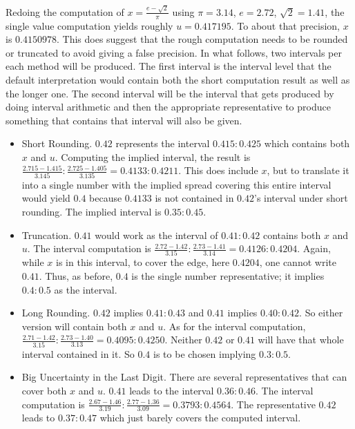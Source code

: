 \documentclass[12pt]{article}
\theoremstyle{remark}
\begin{document}
Redoing the computation of $x = \frac{e-\sqrt{2}}{\pi}$  using $\pi = 3.14$, $e=2.72$, $\sqrt{2} = 1.41$, the single value computation yields roughly $u = 0.417195$. To about that precision, $x$ is $0.4150978$. This does suggest that the rough computation needs to be rounded or truncated to avoid giving a false precision. In what follows, two intervals per each method will be produced. The first interval is the interval level that the default interpretation would contain both the short computation result as well as the longer one. The second interval will be the interval that gets produced by doing interval arithmetic and then the appropriate representative to produce something that contains that interval will also be given. 

\begin{itemize}
    \item Short Rounding. $0.42$ represents the interval $0.415:0.425$ which contains both $x$ and $u$.  Computing the implied interval, the result is $\frac{2.715-1.415}{3.145}: \frac{2.725-1.405}{3.135} = 0.4133:0.4211$. This does include $x$, but to translate it into a single number with the implied spread covering this entire interval would yield $0.4$ because $0.4133$ is not contained in $0.42$'s interval under short rounding. The implied interval is $0.35:0.45$.
    \item Truncation. $0.41$ would work as the interval of $0.41:0.42$ contains both $x$ and $u$. The interval computation is $\frac{2.72 - 1.42}{3.15}:\frac{2.73 - 1.41}{3.14} = 0.4126: 0.4204$. Again, while $x$ is in this interval, to cover the edge, here $0.4204$, one cannot write $0.41$. Thus, as before, $0.4$ is the single number representative; it implies $0.4:0.5$ as the interval. 
    \item Long Rounding. $0.42$ implies $0.41:0.43$ and $0.41$ implies $0.40:0.42$. So either version will contain both $x$ and $u$. As for the interval computation, $\frac{2.71 - 1.42}{3.15}:\frac{2.73 - 1.40}{3.13} = 0.4095: 0.4250$. Neither $0.42$ or $0.41$ will have that whole interval contained in it. So $0.4$ is to be chosen implying $0.3:0.5$. 
    \item Big Uncertainty in the Last Digit. There are several representatives that can cover both $x$ and $u$. $0.41$ leads to the interval $0.36:0.46$. The interval computation is $\frac{2.67 - 1.46}{3.19}:\frac{2.77 - 1.36}{3.09} = 0.3793: 0.4564$. The representative $0.42$ leads to $0.37:0.47$ which just barely covers the computed interval.  
\end{itemize}
\end{document}
